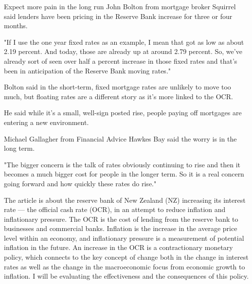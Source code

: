 \documentclass[a4paper,12pt]{article}
\begin{document}
Expect more pain in the long run
John Bolton from mortgage broker Squirrel said lenders have been pricing in the Reserve Bank increase for three or four months.

"If I use the one year fixed rates as an example, I mean that got as low as about 2.19 percent. And today, those are already up at around 2.79 percent. So, we've already sort of seen over half a percent increase in those fixed rates and that's been in anticipation of the Reserve Bank moving rates."

Bolton said in the short-term, fixed mortgage rates are unlikely to move too much, but floating rates are a different story as it's more linked to the OCR.

He said while it's a small, well-sign posted rise, people paying off mortgages are entering a new environment.

Michael Gallagher from Financial Advice Hawkes Bay said the worry is in the long term.

"The bigger concern is the talk of rates obviously continuing to rise and then it becomes a much bigger cost for people in the longer term. So it is a real concern going forward and how quickly these rates do rise."

\newpage


The article is about the reserve bank of New Zealand (NZ) increasing its interest rate --- the official cash rate (OCR), in an attempt to reduce inflation and inflationary pressure. The OCR is the cost of lending from the reserve bank to businesses and commercial banks. Inflation is the increase in the average price level within an economy, and inflationary pressure is a measurement of potential inflation in the future. An increase in the OCR is a contractionary monetary policy, which connects to the key concept of change both in the change in interest rates as well as the change in the macroeconomic focus from economic growth to inflation. I will be evaluating the effectiveness and the consequences of this policy.
\end{document}
